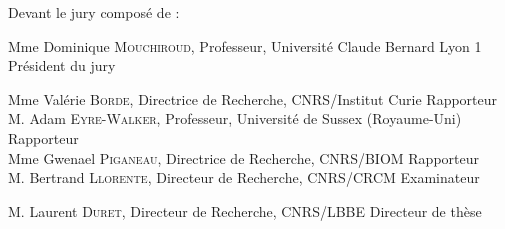 \fontsize{12pt}{14pt}\selectfont
Devant le jury composé de :
\bigskip\bigskip

\fontsize{11pt}{13pt}\selectfont
%
Mme Dominique \textsc{Mouchiroud}, Professeur, Universit\'e Claude Bernard Lyon 1 \hfill Pr\'esident du jury\bigskip %
%

Mme Val\'erie \textsc{Borde}, Directrice de Recherche, CNRS/Institut Curie \hfill  Rapporteur\\
%
M. Adam \textsc{Eyre-Walker}, Professeur, Universit\'e de Sussex (Royaume-Uni) \hfill Rapporteur\\
%
Mme Gwenael \textsc{Piganeau}, Directrice de Recherche, CNRS/BIOM \hfill Rapporteur\\
%
M. Bertrand \textsc{Llorente}, Directeur de Recherche, CNRS/CRCM \hfill Examinateur\bigskip

M. Laurent \textsc{Duret}, Directeur de Recherche, CNRS/LBBE \hfill Directeur de th\`ese\\
%

\newpage\thispagestyle{empty}
\null
\newpage

\endgroup
\restoregeometry
